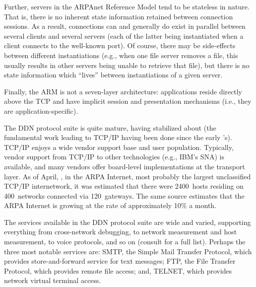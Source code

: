 Further,
servers in the ARPAnet Reference Model tend to be stateless in nature.
That is,
there is no inherent state information retained between connection sessions.
As a result,
connections can and generally do exist in parallel between several clients and
several servers
(each of the latter being instantiated when a client connects to the
well-known port).
Of course,
there may be side-effects between different instantiations
(e.g., when one file server removes a file,
this usually results in other servers being unable to retrieve that file),
but there is no state information which ``lives'' between instantiations of a
given server.

Finally,
the ARM is not a seven-layer architecture:
applications reside directly above the TCP
and have implicit session and presentation mechanisms
(i.e., they are application-specific).

The DDN protocol suite is quite mature,
having stabilized about {}
(the fundamental work leading to TCP/IP having been done since the early
{\/}'s).
TCP/IP enjoys a wide vendor support base and user population.
Typically, vendor support from TCP/IP to other technologies
(e.g., IBM's SNA\cite{SNA}) is available,
and many vendors offer board-level implementations at the transport layer.
As of April, {},
in the ARPA Internet,
most probably the largest unclassified TCP/IP internetwork,
it was estimated that there were 2400~hosts residing on 400~networks
connected via 120~gateways.
The same source\cite{IP.Requirements} estimates that the ARPA Internet is
growing at the rate of approximately 10\% a month.

The services available in the DDN protocol suite are wide and varied,
supporting everything from cross-network debugging,
to network measurement and host measurement,
to voice protocols,
and so on (consult \cite{Assigned.Numbers} for a full list).
Perhaps the three most notable services are:
SMTP\cite{SMTP}, the Simple Mail Transfer Protocol,
which provides store-and-forward service for text messages;
FTP\cite{FTP}, the File Transfer Protocol,
which provides remote file access;
and,
TELNET\cite{TELNET}, which provides network virtual terminal access.

